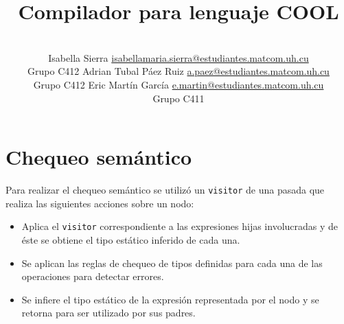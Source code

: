 \documentclass[a4paper,10pt,twocolumn]{article}
\title{Compilador para lenguaje COOL}
\author{\\
\name Isabella Sierra \email \href{mailto:isabellamaria.sierra@estudiantes.matcom.uh.cu}{isabellamaria.sierra@estudiantes.matcom.uh.cu}
	\\ \addr Grupo C412 \AND
\name Adrian Tubal Páez Ruiz \email \href{mailto:a.paez@estudiantes.matcom.uh.cu}{a.paez@estudiantes.matcom.uh.cu}
	\\ \addr Grupo C412  \AND
\name Eric Martín García \email \href{mailto:e.martin@estudiantes.matcom.uh.cu}{e.martin@estudiantes.matcom.uh.cu}
	\\ \addr Grupo C411 
 }
\begin{document}







\section{Chequeo semántico}

Para realizar el chequeo semántico se utilizó un \lstinline|visitor| de una pasada que realiza las siguientes acciones sobre un nodo:

\begin{itemize}
	\item Aplica el \lstinline|visitor| correspondiente a las expresiones hijas involucradas y de éste se obtiene el tipo estático inferido de cada una. 
	\item Se aplican las reglas de chequeo de tipos definidas para cada una de las operaciones para detectar errores. 
	\item Se infiere el tipo estático de la expresión representada por el nodo y se retorna para ser utilizado por sus padres. 
\end{itemize}
\end{document}
